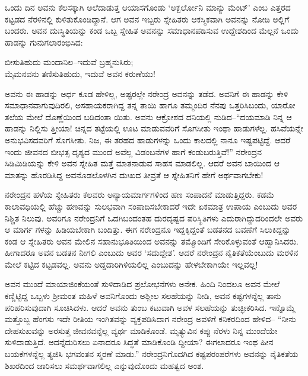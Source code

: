 ಒಂದು ದಿನ ಅವನು ಕೆಲಸಕ್ಕಾಗಿ ಅಲೆದಾಡುತ್ತ ಆಯಾಸಗೊಂಡು ‘ಅಕ್ಬರ್ಲೋನಿ ಮಾನ್ಯು ಮೆಂಟ್’ ಎಂಬ ಎತ್ತರದ ಕಟ್ಟಡದ ನೆರಳಿನಲ್ಲಿ ಕುಳಿತುಕೊಂಡಿದ್ದಾನೆ. ಆಗ ಅವನ ಇಬ್ಬರು ಸ್ನೇಹಿತರು ಆಕಸ್ಮಿಕವಾಗಿ ಅವನನ್ನು ನೋಡಿ ಅಲ್ಲಿಗೆ ಬಂದರು. ಅವನ ದುಃಸ್ಥಿತಿಯನ್ನು ಕಂಡ ಒಬ್ಬ ಸ್ನೇಹಿತ ಅವನನ್ನು ಸಮಾಧಾನಪಡಿಸುವ ಉದ್ದೇಶದಿಂದ ಮೆಲ್ಲನೆ ಒಂದು ಹಾಡನ್ನು ಗುನುಗಲಾರಂಭಿಸಿದ:

\begin{myquote}
ಬೀಸುತಿಹುದು ಮಂದಾನಿಲ–ಇದುವೆ ಬ್ರಹ್ಮನುಸಿರು;\\ಮೈಮನವನು ತಣಿಸುತಿಹುದು, ಇದುವೆ ಅವನ ಕರುಣೆಯು!
\end{myquote}

\noindent

ಅವನು ಈ ಹಾಡನ್ನು ಅರ್ಧ ಕೂಡ ಹೇಳಿಲ್ಲ, ಅಷ್ಟರಲ್ಲೇ ನರೇಂದ್ರ ಅವನನ್ನು ತಡೆದ. ಅವನಿಗೆ ಈ ಹಾಡನ್ನು ಕೇಳಿ ಸಮಾಧಾನವಾಗುವುದಿರಲಿ, ಅಸಹಾಯಕರಾಗಿದ್ದ ತನ್ನ ತಾಯಿ ಹಾಗೂ ತಮ್ಮಂದಿರ ನೆನಪು ಒತ್ತರಿಸಿಬಂದು, ಯಾರೋ ತಲೆಯ ಮೇಲೆ ದೊಣ್ಣೆಯಿಂದ ಬಡಿದಂತಾ ಯಿತು. ಅವನು ಆಕ್ರೋಶದ ದನಿಯಲ್ಲಿ ನುಡಿದ–“ದಯಮಾಡಿ ನಿನ್ನ ಆ ಹಾಡನ್ನು ನಿಲ್ಲಿಸು ತ್ತೀಯಾ! ಚಿನ್ನದ ತಟ್ಟೆಯಲ್ಲಿ ಊಟ ಮಾಡುವವರಿಗೆ ಸೊಗಸೀತು ಇಂಥಾ ಹಾಡುಗಳೆಲ್ಲ. ಹಸಿವೆಯನ್ನೇ ಅನುಭವಿಸದವರಿಗೆ ಸೊಗಸೀತು. ನಿಜ, ಈ ತರಹದ ಹಾಡುಗಳನ್ನು ಒಂದು ಕಾಲದಲ್ಲಿ ನಾನೂ ಇಷ್ಟಪಟ್ಟಿದ್ದೆ. ಆದರೆ ಇಂದು ಜೀವನದ ಬೀಭತ್ಸ ದೃಶ್ಯದ ಮುಂದೆ ಅವೆಲ್ಲ ವಿಡಂಬನೆಗಳ ಹಾಗೆ ಕಂಡುಬರುತ್ತಿವೆ!” ನರೇಂದ್ರನ ಸಿಡಿಮಿಡಿಯನ್ನು ಕೇಳಿ ಅವನ ಸ್ನೇಹಿತ ಮತ್ತೆ ಮಾತನಾಡುವ ಸಾಹಸ ಮಾಡಲಿಲ್ಲ. ಆದರೆ ಅವನ ಬಾಯಿಂದ ಆ ಮಾತನ್ನು ಹೊರಡಿಸಿದ್ದ ಅವನೊಡಲೊಳಗಿನ ದುಃಖದ ತೀವ್ರತೆ ಆ ಸ್ನೇಹಿತನಿಗೆ ಹೇಗೆ ಅರ್ಥವಾಗಬೇಕು!

ನರೇಂದ್ರನ ಹಳೆಯ ಸ್ನೇಹಿತರು ಕೆಲವರು ಅನ್ಯಾಯಮಾರ್ಗಗಳಿಂದ ಹಣ ಸಂಪಾದನೆ ಮಾಡುತ್ತಿದ್ದರು. ಕಡಮೆ ಕಾಲಾವಧಿಯಲ್ಲಿ ಹೆಚ್ಚು ಹಣವನ್ನು ಸುಲಭವಾಗಿ ಸಂಪಾದಿಸಬೇಕಾದರೆ ಇದೇ ಏಕಮಾತ್ರ ಉಪಾಯ ಎಂಬುದು ಅವರ ನಿಶ್ಚಿತ ನಿಲುವು. ಅವರಿಗೂ ನರೇಂದ್ರನಿಗೆ ಒದಗಿಬಂದಂತಹ ದುರದೃಷ್ಟದ ಪರಿಸ್ಥಿತಿಗಳು ಎದುರಾಗಿದ್ದುದರಿಂದಲೇ ಅವರು ಆ ಮಾರ್ಗ ಗಳನ್ನು ಹಿಡಿಯಬೇಕಾಗಿ ಬಂದಿತ್ತು. ಈಗ ನರೇಂದ್ರನೂ ಇದ್ದಕ್ಕಿದ್ದಂತೆ ಬಡತನದ ಬವಣೆಗೆ ಸಿಲುಕಿದ್ದನ್ನು ಕಂಡ ಆ ಸ್ನೇಹಿತರು ಅವನ ಮೇಲಿನ ಸಹಾನುಭೂತಿಯಿಂದ ಅವನನ್ನು ತಮ್ಮೊಂದಿಗೆ ಸೇರಿಕೊಳ್ಳುವಂತೆ ಆಹ್ವಾನಿಸಿದರು. ಹೀಗಾದರೂ ಅವನ ಬಡತನ ನೀಗಲಿ ಎಂಬುದು ಅವರ ‘ಸದುದ್ದೇಶ’. ಆದರೆ ನರೇಂದ್ರನ ನೈತಿಕತೆಯೆಂಬುದು ಮರಳಿನ ಮೇಲೆ ಕಟ್ಟಿದ ಕಟ್ಟಡವಲ್ಲ. ಅವನು ಅಡ್ಡದಾರಿಗಿಳಿಯಲಿಲ್ಲ ಎಂಬುದನ್ನು ಹೇಳಬೇಕಾಗಿಯೇ ಇಲ್ಲವಲ್ಲ!

ಅವನ ಮುಂದೆ ಮಾಯಾಜಿಂಕೆಯಂತೆ ಸುಳಿದಾಡಿದ ಪ್ರಲೋಭನೆಗಳು ಅನೇಕ. ಹಿಂದಿ ನಿಂದಲೂ ಅವನ ಮೇಲೆ ಕಣ್ಣಿಟ್ಟಿದ್ದ ಒಬ್ಬಳು ಶ್ರೀಮಂತ ಮಹಿಳೆ ಅವನಿಗೊಂದು ಅಶ್ಲೀಲ ಸಲಹೆಯನ್ನು ನೀಡಿ, ಅವನ ಕಷ್ಟಗಳನ್ನೆಲ್ಲ ತಾನು ಪರಿಹರಿಸುವುದಾಗಿ ಸೂಚಿಸಿದಳು. ಆದರೆ ಅವನು ತುಂಬ ಕಟುವಾಗಿ ಅವಳ ಸಲಹೆಯನ್ನು ತುಚ್ಛೀಕರಿಸಿದ. ಇನ್ನೊಮ್ಮೆ ಮತ್ತೊಬ್ಬ ಹೆಂಗಸು ಇದೇ ರೀತಿಯ ಇಂಗಿತವನ್ನು ವ್ಯಕ್ತಪಡಿಸಿದಾಗ ನರೇಂದ್ರ ಅವಳಿಗೆ ಕನಿಕರದಿಂದ ಹೇಳಿದ– “ನೀನು ದೇಹಸುಖವನ್ನು ಅರಸುತ್ತ ಜೀವನವನ್ನೆಲ್ಲ ವ್ಯರ್ಥ ಮಾಡಿಕೊಂಡೆ. ಮೃತ್ಯುವಿನ ಕಪ್ಪು ನೆರಳು ನಿನ್ನ ಮುಂದೆಯೇ ಸುಳಿದಾಡುತ್ತಿದೆ. ಅದನ್ನೆದುರಿಸಲು ಏನಾದರೂ ಸಿದ್ಧತೆ ಮಾಡಿಕೊಂಡಿ ದ್ದೀಯಾ? ಈಗಲಾದರೂ ಇಂಥ ಹೀನ ಬಯಕೆಗಳನ್ನೆಲ್ಲ ತ್ಯಜಿಸಿ ಭಗವಂತನ ಸ್ಮರಣೆ ಮಾಡು.” ನರೇಂದ್ರನಿಗೊದಗಿದ ಕಷ್ಟಪರಂಪರೆಗಳು ಅವನನ್ನು ನೈತಿಕತೆಯ ಶಿಖರದಿಂದ ಜಾರಿಸಲು ಸಮರ್ಥವಾಗಲಿಲ್ಲ ಎನ್ನುವುದೊಂದು ಮಹತ್ವದ ಅಂಶ.

